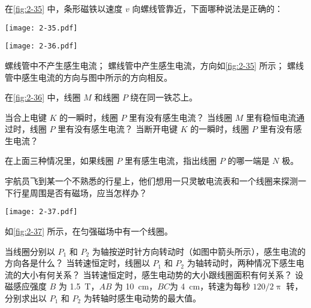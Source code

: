 \begin{Exercise}
\begin{question}
  \item 在\cref{fig:2-35} 中，条形磁铁以速度 $v$ 向螺线管靠近，下面哪种说法是正确的：
  \begin{figurehere}
    \begin{minipage}[b]{0.38\linewidth}\centering
      \texttt{[image: 2-35.pdf]}
      \caption{}\label{fig:2-35}
    \end{minipage}
    \begin{minipage}[b]{0.58\linewidth}\centering
      \texttt{[image: 2-36.pdf]}
      \caption{}\label{fig:2-36}
    \end{minipage}
  \end{figurehere}
  \begin{tasks}
    \task 螺线管中不产生感生电流；
    \task 螺线管中产生感生电流，方向如\cref{fig:2-35} 所示；
    \task 螺线管中感生电流的方向与图中所示的方向相反。
  \end{tasks}
  \item 在\cref{fig:2-36} 中，线圈 $M$ 和线圈 $P$ 绕在同一铁芯上。
  \begin{tasks}
    \task 当合上电键 $K$ 的一瞬时，线圈 $P$ 里有没有感生电流？
    \task 当线圈 $M$ 里有稳恒电流通过时，线圈 $P$ 里有没有感生电流？
    \task 当断开电键 $K$ 的一瞬时，线圈 $P$ 里有没有感生电流？
  \end{tasks}
  在上面三种情况里，如果线圈 $P$ 里有感生电流，指出线圈 $P$ 的哪一端是 $N$ 极。
  \item 宇航员飞到某一个不熟悉的行星上，他们想用一只灵敏电流表和一个线圈来探测一下行星周围是否有磁场，应当怎样办？
  \begin{figurehere}
    \begin{minipage}{\linewidth}\centering
      \texttt{[image: 2-37.pdf]}
      \caption{}\label{fig:2-37}
    \end{minipage}
  \end{figurehere}
  \item 如\cref{fig:2-37} 所示，在匀强磁场中有一个线圈。
  \begin{tasks}
    \task 当线圈分别以 $P_1$ 和 $P_2$ 为轴按逆时针方向转动时（如图中箭头所示），感生电流的方向各是什么？
    \task 当转速恒定时，线圈以 $P_1$ 和 $P_2$ 为轴转动时，两种情况下感生电流的大小有何关系？
    \task 当转速恒定时，感生电动势的大小跟线圈面积有何关系？
    \task 设磁感应强度 $B$ 为 \qty{1.5}{T}，$AB$ 为 \qty{10}{cm}，$BC$为 \qty{4}{cm}，转速为每秒 $120/2\uppi$ 转，分别求出以 $P_1$ 和 $P_2$ 为转轴时感生电动势的最大值。

\end{tasks}
\end{question}
\end{Exercise}
